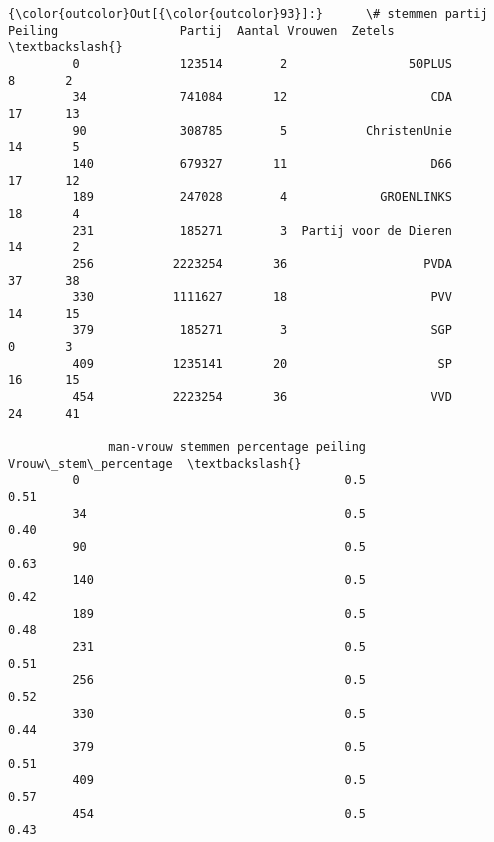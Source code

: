 \documentclass{article}
\begin{document}
            \begin{Verbatim}[commandchars=\\\{\}]
{\color{outcolor}Out[{\color{outcolor}93}]:}      \# stemmen partij  Peiling                 Partij  Aantal Vrouwen  Zetels  \textbackslash{}
         0              123514        2                 50PLUS               8       2   
         34             741084       12                    CDA              17      13   
         90             308785        5           ChristenUnie              14       5   
         140            679327       11                    D66              17      12   
         189            247028        4             GROENLINKS              18       4   
         231            185271        3  Partij voor de Dieren              14       2   
         256           2223254       36                   PVDA              37      38   
         330           1111627       18                    PVV              14      15   
         379            185271        3                    SGP               0       3   
         409           1235141       20                     SP              16      15   
         454           2223254       36                    VVD              24      41   
         
              man-vrouw stemmen percentage peiling  Vrouw\_stem\_percentage  \textbackslash{}
         0                                     0.5                   0.51   
         34                                    0.5                   0.40   
         90                                    0.5                   0.63   
         140                                   0.5                   0.42   
         189                                   0.5                   0.48   
         231                                   0.5                   0.51   
         256                                   0.5                   0.52   
         330                                   0.5                   0.44   
         379                                   0.5                   0.51   
         409                                   0.5                   0.57   
         454                                   0.5                   0.43   
         

\end{Verbatim}
\end{document}
